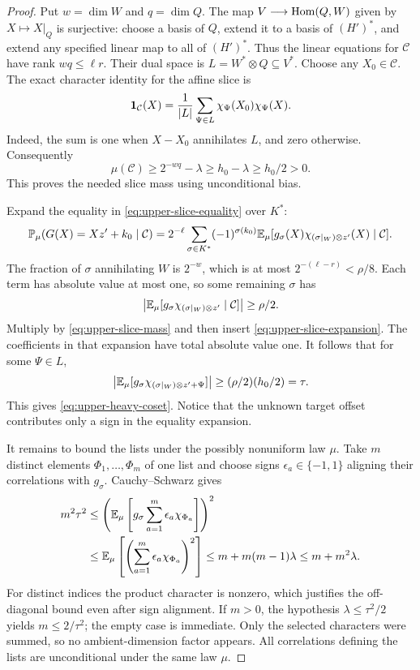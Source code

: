 \begin{proof}
Put $w=\dim W$ and $q=\dim Q$.  The map
$V\longrightarrow\operatorname{Hom}(Q,W)$ given by $X\mapsto X|_Q$ is surjective:
choose a basis of $Q$, extend it to a basis of $(H')^*$, and extend any
specified linear map to all of $(H')^*$.  Thus the linear equations for
$\mathcal C$ have rank $wq\le\ell r$.  Their dual space is
$L=W^*\otimes Q\subseteq V^*$.  Choose any $X_0\in\mathcal C$.  The
exact character identity for the affine slice is
\begin{equation}\label{eq:upper-slice-expansion}
 \mathbf 1_{\mathcal C}(X)
   =\frac1{|L|}\sum_{\Psi\in L}\chi_\Psi(X_0)\chi_\Psi(X).
\end{equation}
Indeed, the sum is one when $X-X_0$ annihilates $L$, and zero otherwise.
Consequently
\begin{equation}\label{eq:upper-slice-mass}
 \mu(\mathcal C)\ge2^{-wq}-\lambda\ge h_0-\lambda\ge h_0/2>0.
\end{equation}
This proves the needed slice mass using unconditional bias.

Expand the equality in \eqref{eq:upper-slice-equality} over $K^*$:
\[
 \mathbb P_\mu(G(X)=Xz'+k_0\mid\mathcal C)
 =2^{-\ell}\sum_{\sigma\in K^*}(-1)^{\sigma(k_0)}
    \mathbb E_\mu[g_\sigma(X)\chi_{(\sigma|_W)\otimes z'}(X)
                    \mid\mathcal C].
\]
The fraction of $\sigma$ annihilating $W$ is $2^{-w}$, which is at most
$2^{-(\ell-r)}<\rho/8$.  Each term has absolute value at most one, so
some remaining $\sigma$ has
\[
 \left|\mathbb E_\mu[g_\sigma\chi_{(\sigma|_W)\otimes z'}\mid\mathcal C]\right|
 \ge\rho/2.
\]
Multiply by \eqref{eq:upper-slice-mass} and then insert
\eqref{eq:upper-slice-expansion}.  The coefficients in that expansion
have total absolute value one.  It follows that for some $\Psi\in L$,
\[
 \left|\mathbb E_\mu[g_\sigma
       \chi_{(\sigma|_W)\otimes z'+\Psi}]\right|
 \ge(\rho/2)(h_0/2)=\tau.
\]
This gives \eqref{eq:upper-heavy-coset}.  Notice that the unknown target
offset contributes only a sign in the equality expansion.

It remains to bound the lists under the possibly nonuniform law $\mu$.
Take $m$ distinct elements $\Phi_1,\ldots,\Phi_m$ of one list and choose
signs $\epsilon_a\in\{-1,1\}$ aligning their correlations with
$g_\sigma$.  Cauchy--Schwarz gives
\begin{align*}
 m^2\tau^2
 &\le\left(\mathbb E_\mu\left[g_\sigma
               \sum_{a=1}^m\epsilon_a\chi_{\Phi_a}\right]\right)^2\\
 &\le\mathbb E_\mu\left[\left(\sum_{a=1}^m
                   \epsilon_a\chi_{\Phi_a}\right)^2\right]
 \le m+m(m-1)\lambda\le m+m^2\lambda.
\end{align*}
For distinct indices the product character is nonzero, which justifies
the off-diagonal bound even after sign alignment.  If $m>0$, the hypothesis
$\lambda\le\tau^2/2$ yields $m\le2/\tau^2$; the empty case is immediate.
Only the selected characters were summed, so no ambient-dimension factor
appears.  All correlations defining the lists are unconditional under the
same law $\mu$.
\end{proof}

